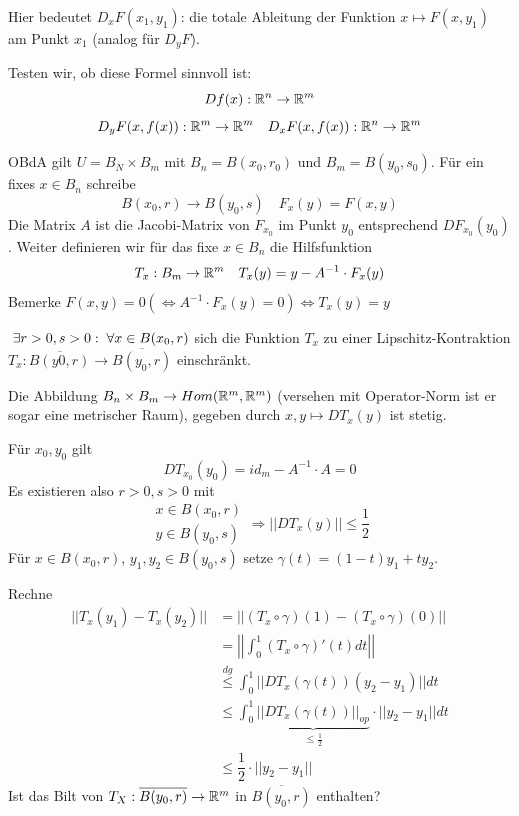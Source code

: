\documentclass[main.tex]{subfiles}
\begin{document}
\begin{Bemerkung}
  Hier bedeutet $D_x F(x_1,y_1)$: die totale Ableitung der Funktion $x \mapsto F(x,y_1)$ am Punkt $x_1$ (analog für $D_y F$).
\end{Bemerkung}

\begin{Bemerkung}
  Testen wir, ob diese Formel sinnvoll ist:
  $$Df(x) : \mathbb{R}^n \to \mathbb{R}^m$$
  $$D_y F(x,f(x)) : \mathbb{R}^m \to \mathbb{R}^m \quad D_x F(x,f(x)): \mathbb{R}^n \to \mathbb{R}^m$$
\end{Bemerkung}

\begin{Beweis}
  OBdA gilt $U = B_N \times B_m$ mit $B_n = B(x_0,r_0)$ und $B_m = B(y_0,s_0)$. Für ein fixes $x \in B_n$ schreibe
  $$B(x_0, r) \to B(y_0,s) \quad F_x(y) = F(x,y)$$
  Die Matrix $A$ ist die Jacobi-Matrix von $F_{x_0}$ im Punkt $y_0$ entsprechend $DF_{x_0}(y_0)$. Weiter definieren wir für das fixe $x \in B_n$ die Hilfsfunktion
  $$T_x: B_m \to \mathbb{R}^m \quad T_x(y) = y - A^{-1} \cdot F_x(y)$$
  Bemerke $F(x,y) = 0 (\Leftrightarrow A^{-1} \cdot F_x(y) = 0) \Leftrightarrow T_x(y) = y$

  \begin{Theorem}
    $\;\exists r>0, s>0 : \;\forall x \in B(x_0,r)$ sich die Funktion $T_x$ zu einer Lipschitz-Kontraktion $T_x : \overline{B(y0,r)} \to \overline{B(y_0,r)}$ einschränkt.
  \end{Theorem}
  \begin{Beweis}
    Die Abbildung $B_n \times B_m \to Hom(\mathbb{R}^m,\mathbb{R}^m)$ (versehen mit Operator-Norm ist er sogar eine metrischer Raum), gegeben durch $x,y \mapsto DT_x(y)$ ist stetig.

    Für $x_0,y_0$ gilt
    $$DT_{x_0}(y_0) = id_m - A^{-1} \cdot A = 0$$
    Es existieren also $r > 0, s>0$ mit
    $$\begin{array}{c}
      x \in B(x_0,r) \\ y \in B(y_0,s)
    \end{array}
    \Rightarrow ||DT_x(y)|| \leq \dfrac{1}{2}$$
    Für $x \in B(x_0,r)$, $y_1,y_2 \in B(y_0,s)$ setze $\gamma(t) = (1-t)y_1 + ty_2$.

    Rechne
    $$\begin{aligned}
      ||T_x(y_1) - T_x(y_2)|| & = ||(T_x \circ \gamma)(1) - (T_x \circ \gamma)(0)|| \\
      & = \left|\left|\int_0^1 (T_x \circ \gamma)'(t)dt\right|\right| \\
      & \stackrel{dg}{\leq} \int_0^1 ||D T_x(\gamma(t))(y_2 - y_1) || dt \\
      & \leq \int_0^1 \underbrace{||D T_x(\gamma(t))||_{op}}_{\leq \frac{1}{2}} \cdot ||y_2 - y_1|| dt \\
      & \leq \dfrac{1}{2} \cdot ||y_2 - y_1||
    \end{aligned}$$
    Ist das Bilt von $T_X : \overline{B(y_0,r)} \to \mathbb{R}^m$ in $\overline{B(y_0,r)}$ enthalten?


\end{Beweis}
\end{Beweis}
\end{document}
